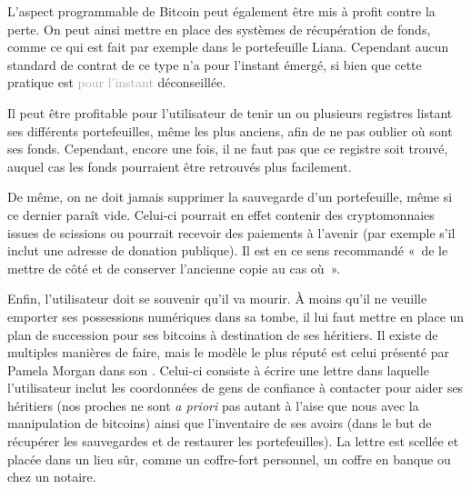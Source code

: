 L'aspect programmable de Bitcoin peut également être mis à profit contre la perte. On peut ainsi mettre en place des systèmes de récupération de fonds, comme ce qui est fait par exemple dans le portefeuille Liana. Cependant aucun standard de contrat de ce type n'a pour l'instant émergé, si bien que cette pratique est \textcolor{darkgray}{pour l'instant} déconseillée. %

Il peut être profitable pour l'utilisateur de tenir un ou plusieurs registres listant ses différents portefeuilles, même les plus anciens, afin de ne pas oublier où sont ses fonds. Cependant, encore une fois, il ne faut pas que ce registre soit trouvé, auquel cas les fonds pourraient être retrouvés plus facilement.

De même, on ne doit jamais supprimer la sauvegarde d'un portefeuille, même si ce dernier paraît vide. Celui-ci pourrait en effet contenir des cryptomonnaies issues de scissions ou pourrait recevoir des paiements à l'avenir (par exemple s'il inclut une adresse de donation publique). Il est en ce sens recommandé «~de le mettre de côté et de conserver l'ancienne copie au cas où~».

Enfin, l'utilisateur doit se souvenir qu'il va mourir. À moins qu'il ne veuille emporter ses possessions numériques dans sa tombe, il lui faut mettre en place un plan de succession pour ses bitcoins à destination de ses héritiers. Il existe de multiples manières de faire, mais le modèle le plus réputé est celui présenté par Pamela Morgan dans son . Celui-ci consiste à écrire une lettre dans laquelle l'utilisateur inclut les coordonnées de gens de confiance à contacter pour aider ses héritiers (nos proches ne sont \emph{a priori} pas autant à l'aise que nous avec la manipulation de bitcoins) ainsi que l'inventaire de ses avoirs (dans le but de récupérer les sauvegardes et de restaurer les portefeuilles). La lettre est scellée et placée dans un lieu sûr, comme un coffre-fort personnel, un coffre en banque ou chez un notaire.

